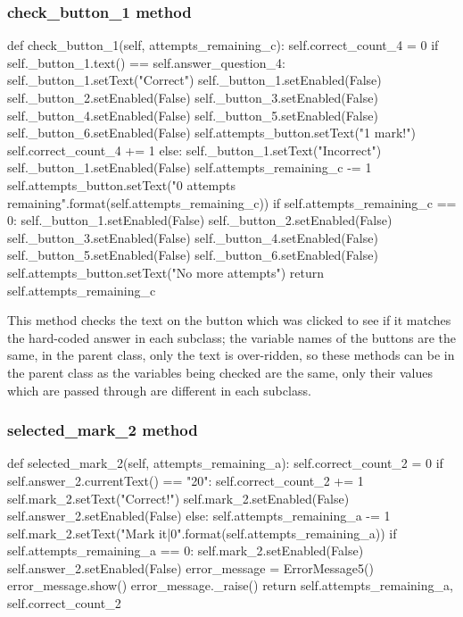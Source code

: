 \subsubsection{check\_button\_1 method}

\begin{python}
def check_button_1(self, attempts_remaining_c):
        self.correct_count_4 = 0
        if self._button_1.text() == self.answer_question_4:
            self._button_1.setText("Correct")
            self._button_1.setEnabled(False)
            self._button_2.setEnabled(False)
            self._button_3.setEnabled(False)
            self._button_4.setEnabled(False)
            self._button_5.setEnabled(False)
            self._button_6.setEnabled(False)
            self.attempts_button.setText("1 mark!")
            self.correct_count_4 += 1
        else:
            self._button_1.setText("Incorrect")
            self._button_1.setEnabled(False)
            self.attempts_remaining_c -= 1
            self.attempts_button.setText("{0} attempts remaining".format(self.attempts_remaining_c))
            if self.attempts_remaining_c == 0:
                self._button_1.setEnabled(False)
                self._button_2.setEnabled(False)
                self._button_3.setEnabled(False)
                self._button_4.setEnabled(False)
                self._button_5.setEnabled(False)
                self._button_6.setEnabled(False)
                self.attempts_button.setText("No more attempts")
            return self.attempts_remaining_c
\end{python}

This method checks the text on the button which was clicked to see if it matches the hard-coded answer in each subclass; the variable names of the buttons are the same, in the parent class, only the text is over-ridden, so these methods can be in the parent class as the variables being checked are the same, only their values which are passed through are different in each subclass.

\subsubsection{selected\_mark\_2 method}

\begin{python}
def selected_mark_2(self, attempts_remaining_a):
        self.correct_count_2 = 0
        if self.answer_2.currentText() == "20":
            self.correct_count_2 += 1
            self.mark_2.setText("Correct!")
            self.mark_2.setEnabled(False)
            self.answer_2.setEnabled(False)
        else:
            self.attempts_remaining_a -= 1
            self.mark_2.setText("Mark it|{0}".format(self.attempts_remaining_a))
            if self.attempts_remaining_a == 0:
                self.mark_2.setEnabled(False)
                self.answer_2.setEnabled(False)
            error_message = ErrorMessage5()
            error_message.show()
            error_message._raise()
        return self.attempts_remaining_a, self.correct_count_2
\end{python}

